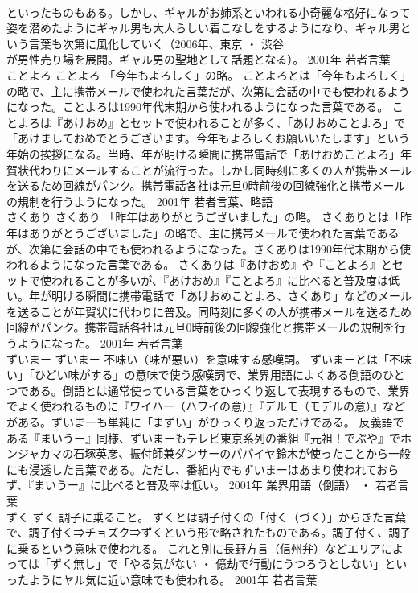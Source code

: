 \documentclass[8pt]{extreport}
\begin{document}
\begin{CJK}{UTF8}{min}
\\	といったものもある。しかし、ギャルがお姉系といわれる小奇麗な格好になって姿を潜めたようにギャル男も大人らしい着こなしをするようになり、ギャル男という言葉も次第に風化していく（2006年、東京 ・ 渋谷
\\	が男性売り場を展開。ギャル男の聖地として話題となる）。	2001年	若者言葉	
\\	ことよろ	ことよろ	「今年もよろしく」の略。	ことよろとは「今年もよろしく」の略で、主に携帯メールで使われた言葉だが、次第に会話の中でも使われるようになった。ことよろは1990年代末期から使われるようになった言葉である。 ことよろは『あけおめ』とセットで使われることが多く、「あけおめことよろ」で「あけましておめでとうございます。今年もよろしくお願いいたします」という年始の挨拶になる。当時、年が明ける瞬間に携帯電話で「あけおめことよろ」年賀状代わりにメールすることが流行った。しかし同時刻に多くの人が携帯メールを送るため回線がパンク。携帯電話各社は元旦0時前後の回線強化と携帯メールの規制を行うようになった。	2001年	若者言葉、略語	
\\	さくあり	さくあり	「昨年はありがとうございました」の略。	さくありとは「昨年はありがとうございました」の略で、主に携帯メールで使われた言葉であるが、次第に会話の中でも使われるようになった。さくありは1990年代末期から使われるようになった言葉である。 さくありは『あけおめ』や『ことよろ』とセットで使われることが多いが、『あけおめ』『ことよろ』に比べると普及度は低い。年が明ける瞬間に携帯電話で「あけおめことよろ、さくあり」などのメールを送ることが年賀状に代わりに普及。同時刻に多くの人が携帯メールを送るため回線がパンク。携帯電話各社は元旦0時前後の回線強化と携帯メールの規制を行うようになった。	2001年	若者言葉	
\\	ずいまー	ずいまー	不味い（味が悪い）を意味する感嘆詞。	ずいまーとは「不味い」「ひどい味がする」の意味で使う感嘆詞で、業界用語によくある倒語のひとつである。倒語とは通常使っている言葉をひっくり返して表現するもので、業界でよく使われるものに『ワイハー（ハワイの意）』『デルモ（モデルの意）』などがある。ずいまーも単純に「まずい」がひっくり返っただけである。 反義語である『まいうー』同様、ずいまーもテレビ東京系列の番組『元祖！でぶや』でホンジャカマの石塚英彦、振付師兼ダンサーのパパイヤ鈴木が使ったことから一般にも浸透した言葉である。ただし、番組内でもずいまーはあまり使われておらず、『まいうー』に比べると普及率は低い。	2001年	業界用語（倒語） ・ 若者言葉	
\\	ずく	ずく	調子に乗ること。	ずくとは調子付くの「付く（づく）」からきた言葉で、調子付く⇒チョズク⇒ずくという形で略されたものである。調子付く、調子に乗るという意味で使われる。 これと別に長野方言（信州弁）などエリアによっては「ずく無し」で「やる気がない ・ 億劫で行動にうつろうとしない」といったようにヤル気に近い意味でも使われる。	2001年	若者言葉	

\end{CJK}
\end{document}
